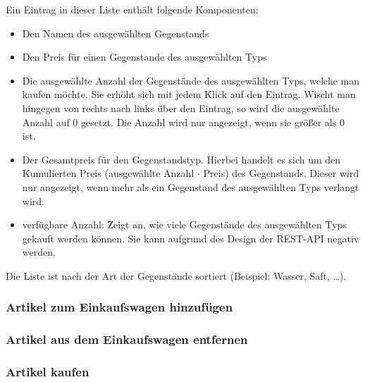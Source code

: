 Ein Eintrag in dieser Liste enthält folgende Komponenten:

\begin{itemize}
	\item Den Namen des ausgewählten Gegenstands

	\item Den Preis für einen Gegenstande des ausgewählten Typs

	\item Die ausgewählte Anzahl der Gegenstände des ausgewählten Typs, welche man kaufen möchte.
	Sie erhöht sich mit jedem Klick auf den Eintrag.
	Wischt man hingegen von rechts nach links über den Eintrag, so wird die ausgewählte Anzahl auf 0 gesetzt.
	Die Anzahl wird nur angezeigt, wenn sie größer als 0 ist.

	\item Der Gesamtpreis für den Gegenstandstyp.
	Hierbei handelt es sich um den Kumulierten Preis (ausgewählte Anzahl $\cdot$ Preis) des Gegenstands.
	Dieser wird nur angezeigt, wenn mehr als ein Gegenstand des ausgewählten Typs verlangt wird.

	\item verfügbare Anzahl: Zeigt an, wie viele Gegenstände des ausgewählten Typs gekauft werden können.
	Sie kann aufgrund des Design der REST-API negativ werden.
\end{itemize}

Die Liste ist nach der Art der Gegenstände sortiert (Beispiel: Wasser, Saft, \ldots).

\subsubsection{Artikel zum Einkaufswagen hinzufügen} \label{subsubsec:shoppingcart-add-item}

\subsubsection{Artikel aus dem Einkaufswagen entfernen} \label{subsubsec:shoppingcart-del-item}

\subsubsection{Artikel kaufen} \label{subsubsec:shop-buy}

